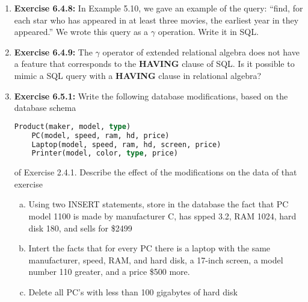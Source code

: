 \documentclass[12pt]{article}
\begin{document}
\begin{enumerate}[1.]
    \item \textbf{Exercise 6.4.8:} In Example 5.10, we gave an example of the query:
    ``find, for each star who has appeared in at least three movies, the earliest year
    in they appeared.'' We wrote this query as a $\gamma$ operation. Write it in SQL.

    \item \textbf{Exercise 6.4.9:} The $\gamma$ operator of extended relational algebra
    does not have a feature that corresponds to the \textbf{HAVING} clause of SQL.
    Is it possible to mimic a SQL query with a \textbf{HAVING} clause in relational
    algebra?

    \item \textbf{Exercise 6.5.1:} Write the following database modifications, based on the
    database schema

    \begin{lstlisting}[language=SQL]
    Product(maker, model, type)
    PC(model, speed, ram, hd, price)
    Laptop(model, speed, ram, hd, screen, price)
    Printer(model, color, type, price)
    \end{lstlisting}

    \bigskip

    of Exercise 2.4.1. Describe the effect of the modifications on the data of that
    exercise

    \begin{enumerate}[a)]
        \item Using two INSERT statements, store in the database the fact that PC
        model 1100 is made by manufacturer C, has spped 3.2, RAM 1024, hard disk 180,
        and sells for \$2499
        \item Intert the facts that for every PC there is a laptop with the same
        manufacturer, speed, RAM, and hard disk, a 17-inch screen, a model number
        110 greater, and a price \$500 more.
        \item Delete all PC's with less than 100 gigabytes of hard disk
    \end{enumerate}
\end{enumerate}
\end{document}
